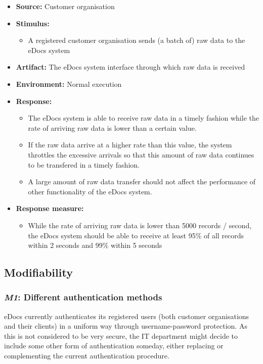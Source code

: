 \documentclass[a4paper,10pt]{article}
\begin{document}
\begin{itemize}
    \item \textbf{Source:} Customer organisation
    \item \textbf{Stimulus:}
        \begin{itemize}
            \item A registered customer organisation sends (a batch of) raw data to the eDocs system
        \end{itemize}

    \item \textbf{Artifact:} The eDocs system interface through which raw data is received
    \item \textbf{Environment:} Normal execution
    \item \textbf{Response:}
        \begin{itemize}
		\item The eDocs system is able to receive raw data in a timely fashion while the rate of arriving raw data is lower than a certain value.
		\item If the raw data arrive at a higher rate than this value, the system throttles the excessive arrivals so that this amount of raw data continues to be transfered in a timely fashion.
		\item A large amount of raw data transfer should not affect the performance of other functionality of the eDocs system.
        \end{itemize}

    \item \textbf{Response measure:}
        \begin{itemize}
		\item While the rate of arriving raw data is lower than 5000 records / second, the eDocs system should be able to receive at least 95\% of all records within 2 seconds and 99\% within 5 seconds
	\end{itemize}
\end{itemize}

\subsection{Modifiability}
\subsubsection{\emph{M1}: Different authentication methods}
eDocs currently authenticates its registered users (both customer organisations and their clients) in a uniform way through username-password protection. As this is not considered to be very secure, the IT department might decide to include some other form of authentication someday, either replacing or complementing the current authentication procedure.
\end{document}
